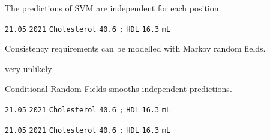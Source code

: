 \documentclass[landscape,footrule]{foils}
\begin{document}
\begin{triangles}
\item The predictions of SVM are independent for each position.\vspace*{1ex}

\colorbox{OliveGreen!80}{\texttt{21.05}} \texttt{2021}
\colorbox{OliveGreen!80}{\texttt{Cholesterol}}
\colorbox{OliveGreen!80}{\texttt{40.6}}
\colorbox{White}{\texttt{;}}
\colorbox{Orange!80}{\texttt{HDL}}
\colorbox{OliveGreen!80}{\texttt{16.3}}
\colorbox{Orange!80}{\texttt{mL}}
\vspace*{2ex}

\item Consistency requirements can be modelled with Markov random fields. \vspace*{1ex}

\colorbox{OliveGreen!80}{} 
\colorbox{OliveGreen!80}{}
\colorbox{OliveGreen!80}{}
\colorbox{White}{\phantom{\texttt{;}}}
\colorbox{Orange!80}{}
\colorbox{OliveGreen!80}{}
\colorbox{Orange!80}{}
\vspace*{-1ex}

\centerline{}\vspace*{0ex}
\centerline{very unlikely}
\vspace*{2ex}

\item Conditional Random Fields smooths independent predictions.\vspace*{1ex} 

\colorbox{OliveGreen!80}{\texttt{21.05}} 
\colorbox{White}{\texttt{2021}}
\colorbox{OliveGreen!80}{\texttt{Cholesterol}}
\colorbox{OliveGreen!80}{\texttt{40.6}}
\colorbox{White}{\texttt{;}}
\colorbox{Orange!80}{\texttt{HDL}}
\colorbox{OliveGreen!80}{\texttt{16.3}}
\colorbox{Orange!80}{\texttt{mL}}
\vspace*{-1ex}

\centerline{}\vspace*{0.5ex}

\colorbox{OliveGreen!80}{\texttt{21.05}} 
\colorbox{OliveGreen!80}{\texttt{2021}}
\colorbox{OliveGreen!80}{\texttt{Cholesterol}}
\colorbox{OliveGreen!80}{\texttt{40.6}}
\colorbox{White}{\texttt{;}}
\colorbox{Orange!80}{\texttt{HDL}}
\colorbox{Orange!80}{\texttt{16.3}}
\colorbox{Orange!80}{\texttt{mL}}
\vspace*{2ex}

\end{triangles} 
\end{document}
